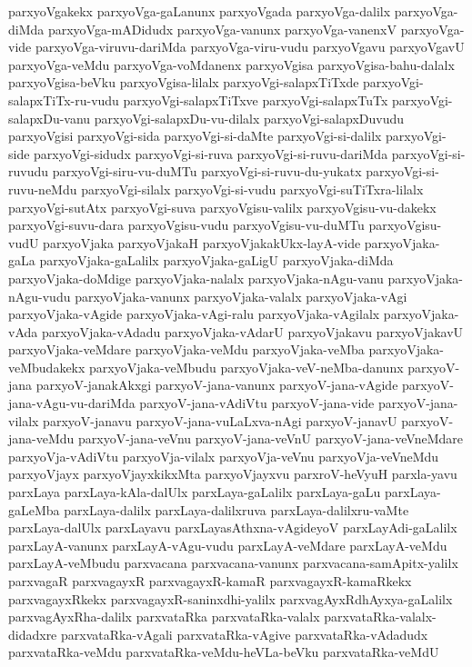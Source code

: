 {parxyoVgakekx
parxyoVga-gaLanunx
parxyoVgada
parxyoVga-dalilx
parxyoVga-diMda
parxyoVga-mADidudx
parxyoVga-vanunx
parxyoVga-vanenxV
parxyoVga-vide
parxyoVga-viruvu-dariMda
parxyoVga-viru-vudu
parxyoVgavu
parxyoVgavU
parxyoVga-veMdu
parxyoVga-voMdanenx
parxyoVgisa
parxyoVgisa-bahu-dalalx
parxyoVgisa-beVku
parxyoVgisa-lilalx
parxyoVgi-salapxTiTxde
parxyoVgi-salapxTiTx-ru-vudu
parxyoVgi-salapxTiTxve
parxyoVgi-salapxTuTx
parxyoVgi-salapxDu-vanu
parxyoVgi-salapxDu-vu-dilalx
parxyoVgi-salapxDuvudu
parxyoVgisi
parxyoVgi-sida
parxyoVgi-si-daMte
parxyoVgi-si-dalilx
parxyoVgi-side
parxyoVgi-sidudx
parxyoVgi-si-ruva
parxyoVgi-si-ruvu-dariMda
parxyoVgi-si-ruvudu
parxyoVgi-siru-vu-duMTu
parxyoVgi-si-ruvu-du-yukatx
parxyoVgi-si-ruvu-neMdu
parxyoVgi-silalx
parxyoVgi-si-vudu
parxyoVgi-suTiTxra-lilalx
parxyoVgi-sutAtx
parxyoVgi-suva
parxyoVgisu-valilx
parxyoVgisu-vu-dakekx
parxyoVgi-suvu-dara
parxyoVgisu-vudu
parxyoVgisu-vu-duMTu
parxyoVgisu-vudU
parxyoVjaka
parxyoVjakaH
parxyoVjakakUkx-layA-vide
parxyoVjaka-gaLa
parxyoVjaka-gaLalilx
parxyoVjaka-gaLigU
parxyoVjaka-diMda
parxyoVjaka-doMdige
parxyoVjaka-nalalx
parxyoVjaka-nAgu-vanu
parxyoVjaka-nAgu-vudu
parxyoVjaka-vanunx
parxyoVjaka-valalx
parxyoVjaka-vAgi
parxyoVjaka-vAgide
parxyoVjaka-vAgi-ralu
parxyoVjaka-vAgilalx
parxyoVjaka-vAda
parxyoVjaka-vAdadu
parxyoVjaka-vAdarU
parxyoVjakavu
parxyoVjakavU
parxyoVjaka-veMdare
parxyoVjaka-veMdu
parxyoVjaka-veMba
parxyoVjaka-veMbudakekx
parxyoVjaka-veMbudu
parxyoVjaka-veV-neMba-danunx
parxyoV-jana
parxyoV-janakAkxgi
parxyoV-jana-vanunx
parxyoV-jana-vAgide
parxyoV-jana-vAgu-vu-dariMda
parxyoV-jana-vAdiVtu
parxyoV-jana-vide
parxyoV-jana-vilalx
parxyoV-janavu
parxyoV-jana-vuLaLxva-nAgi
parxyoV-janavU
parxyoV-jana-veMdu
parxyoV-jana-veVnu
parxyoV-jana-veVnU
parxyoV-jana-veVneMdare
parxyoVja-vAdiVtu
parxyoVja-vilalx
parxyoVja-veVnu
parxyoVja-veVneMdu
parxyoVjayx
parxyoVjayxkikxMta
parxyoVjayxvu
parxroV-heVyuH
parxla-yavu
parxLaya
parxLaya-kAla-dalUlx
parxLaya-gaLalilx
parxLaya-gaLu
parxLaya-gaLeMba
parxLaya-dalilx
parxLaya-dalilxruva
parxLaya-dalilxru-vaMte
parxLaya-dalUlx
parxLayavu
parxLayasAthxna-vAgideyoV
parxLayAdi-gaLalilx
parxLayA-vanunx
parxLayA-vAgu-vudu
parxLayA-veMdare
parxLayA-veMdu
parxLayA-veMbudu
parxvacana
parxvacana-vanunx
parxvacana-samApitx-yalilx
parxvagaR
parxvagayxR
parxvagayxR-kamaR
parxvagayxR-kamaRkekx
parxvagayxRkekx
parxvagayxR-saninxdhi-yalilx
parxvagAyxRdhAyxya-gaLalilx
parxvagAyxRha-dalilx
parxvataRka
parxvataRka-valalx
parxvataRka-valalx-didadxre
parxvataRka-vAgali
parxvataRka-vAgive
parxvataRka-vAdadudx
parxvataRka-veMdu
parxvataRka-veMdu-heVLa-beVku
parxvataRka-veMdU
}
